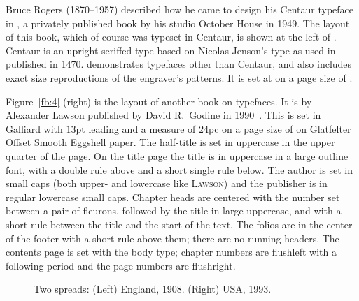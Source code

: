 \documentclass[10pt,a4paper,oneside,extrafontsizes]{memoir}%
\begin{document}
\begin{paracol}{2}
\switchEng
    Bruce Rogers (1870--1957) 
described how he came to design his Centaur typeface in
, a privately published book by his studio October
House in 1949. The layout of this book, which of course was typeset in
Centaur, is shown at the left of . Centaur is an upright
seriffed type based on Nicolas Jenson's type as 
used in  published in 1470. 
 demonstrates typefaces other than
Centaur, and also includes exact size reproductions of the engraver's 
patterns. It is set at  on a page size of .

   Figure~\ref{fb:4} (right) is the layout of another book on typefaces.
It is  by Alexander Lawson published by
David R.~Godine in 1990~\autocite{LAWSON90}.
This is set in Galliard with $13$pt leading and a measure of $24$pc on
a page size of  on Glatfelter 
Offset Smooth Eggshell paper. The half-title
is set in uppercase in the upper quarter of the page. On the 
title page the title is in uppercase in a large outline 
font, with a double rule above and a short single rule below. The author
is set in small caps (both upper- and lowercase like \textsc{Lawson})
and the publisher is in regular lowercase small caps.
Chapter heads are centered with the number set between
a pair of fleurons, followed by the title in 
large uppercase, and with
a short rule between the title and the start of the text. 
The folios
are in the center of the footer with a short rule
above them; there are no running headers. The contents
page is set with the body type; chapter numbers are flushleft with a 
following period and the page numbers are flushright.
\end{paracol}


\begin{figure}
\centering
\begin{minipage}[b]{\pwlayi}
\end{minipage}
\hfill
\begin{minipage}[b]{\pwlayi}
\end{minipage}
\caption[Two spreads: England, 1908 and USA, 1993]%
        {Two spreads: (Left) England, 1908.
         (Right) USA, 1993.} \label{fb:5}
\end{figure}
\end{document}
